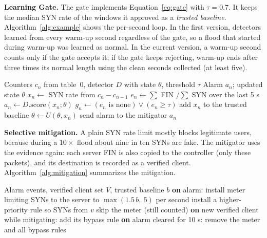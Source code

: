 \documentclass[12pt,a4paper,oneside]{report}
\begin{document}
\textbf{Learning Gate.} The gate implements Equation~\eqref{eq:gate} with $\tau = 0.7$. It keeps the median SYN rate of the windows it approved as a \emph{trusted baseline}. Algorithm~\ref{alg:example} shows the per-second loop. In the first version, detectors learned from every warm-up second regardless of the gate, so a flood that started during warm-up was learned as normal. In the current version, a warm-up second counts only if the gate accepts it; if the gate keeps rejecting, warm-up ends after three times its normal length using the clean seconds collected (at least five).
\begin{algorithm}
\caption{Evidence-gated detection (executed every second)}\label{alg:example}
\begin{algorithmic}[1]
\Require Counters $c_n$ from table~0, detector $D$ with state $\theta$, threshold $\tau$
\Ensure Alarm $a_n$; updated state $\theta$
\State $x_n \gets$ SYN rate from $c_n - c_{n-1}$
\State $e_n \gets \sum$ FIN $/ \sum$ SYN over the last 5 s 
\State $a_n \gets D.\mathrm{score}(x_n;\theta)$ 
\State $g_n \gets (e_n \text{ is none}) \lor (e_n \ge \tau)$
\State add $x_n$ to the trusted baseline
\EndIf
{}
\State $\theta \gets U(\theta, x_n)$ 
\EndIf
{} \State send alarm to the mitigator \EndIf
\State \Return $a_n$
\end{algorithmic}
\end{algorithm}

\textbf{Selective mitigation.} A plain SYN rate limit mostly blocks legitimate users, because during a $10\times$ flood about nine in ten SYNs are fake. The mitigator uses the evidence again: each server FIN is also copied to the controller (only these packets), and its destination is recorded as a verified client. Algorithm~\ref{alg:mitigation} summarizes the mitigation.
\begin{algorithm}
\caption{Selective mitigation with verified-client bypass}\label{alg:mitigation}
\begin{algorithmic}[1]
\Require Alarm events, verified client set $V$, trusted baseline $b$
\State \textbf{on} alarm: install meter limiting SYNs to the server to $\max(1.5\,b,\ 5)$ per second
\State install a higher-priority rule so SYNs from $v$ skip the meter (still counted)
\EndFor
\State \textbf{on} new verified client while mitigating: add its bypass rule
\State \textbf{on} alarm cleared for 10 s: remove the meter and all bypass rules
\end{algorithmic}
\end{algorithm}
\end{document}
